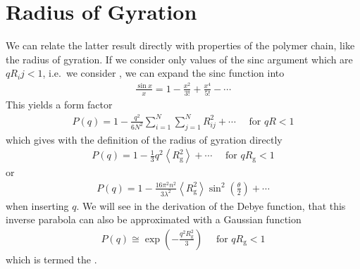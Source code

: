 \documentclass[letterpaper,10pt,english]{sphinxmanual}
\begin{document}
\section{Radius of Gyration}
\label{\detokenize{notebooks/L23/1_Scattering:Radius-of-Gyration}}
\sphinxAtStartPar
We can relate the latter result directly with properties of the polymer chain, like the radius of gyration. If we consider only values of the sinc argument which are \(q R_ij<1\), i.e. we consider , we can expand the sinc function into
\begin{equation*}
\begin{split}\frac{\sin x}{x}=1-\frac{x^{2}}{3 !}+\frac{x^{4}}{5 !}-\cdots\end{split}
\end{equation*}
\sphinxAtStartPar
This yields a form factor
\begin{equation*}
\begin{split}P(q)=1-\frac{q^{2}}{6 N^{2}} \sum_{i=1}^{N} \sum_{j=1}^{N} R_{i j}^{2}+\cdots \quad \text { for } q R<1\end{split}
\end{equation*}
\sphinxAtStartPar
which gives with the definition of the radius of gyration directly
\begin{equation*}
\begin{split}P(q)=1-\frac{1}{3} q^{2}\left\langle R_{\mathrm{g}}^{2}\right\rangle+\cdots \quad \text { for } q R_{\mathrm{g}}<1\end{split}
\end{equation*}
\sphinxAtStartPar
or
\begin{equation*}
\begin{split}P(q)=1-\frac{16 \pi^{2} n^{2}}{3 \lambda^{2}}\left\langle R_{\mathrm{g}}^{2}\right\rangle \sin ^{2}\left(\frac{\theta}{2}\right)+\cdots\end{split}
\end{equation*}
\sphinxAtStartPar
when inserting \(q\). We will see in the derivation of the Debye function, that this inverse parabola can also be approximated with a Gaussian function
\begin{equation*}
\begin{split}P(q) \cong \exp \left(-\frac{q^{2} R_{\mathrm{g}}^{2}}{3}\right) \quad \text { for } q R_{\mathrm{g}}<1\end{split}
\end{equation*}
\sphinxAtStartPar
which is termed the .
\end{document}
